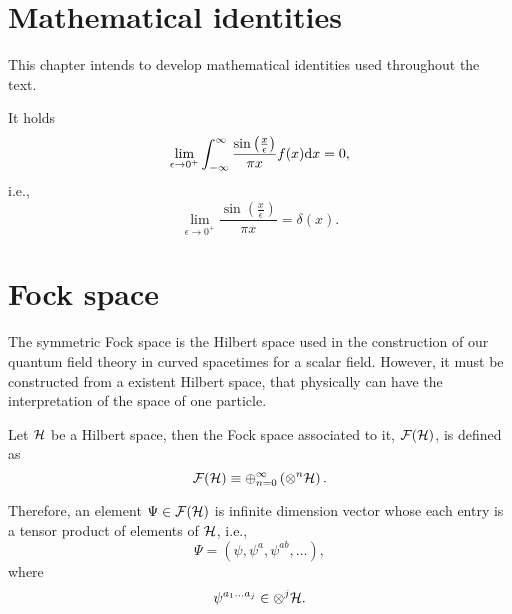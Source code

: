 \appendix

\chapter{Mathematical identities}

This chapter intends to develop mathematical identities used throughout the text.
\begin{proposition}\label{prop:sin-delta}
    It holds
    \begin{equation}
        \lim_{\epsilon\to0^+}\int_{-\infty}^{\infty}\frac{\sin{\left(\frac{x}{\epsilon}\right)}}{\pi x}f(x)\mathrm{d} x=0,
    \end{equation}
    i.e.,
    \begin{equation}
        \lim_{\epsilon\to0^+}\frac{\sin{\left(\frac{x}{\epsilon}\right)}}{\pi x}=\delta(x).
    \end{equation}
\end{proposition}
\vspace{1mm}
\begin{center}
\end{center}
\let\clearpage
\newpage
\pagestyle{empty}\cleardoublepage


\chapter{Fock space}
\pagestyle{fancy}

The symmetric Fock space is the Hilbert space used in the construction of our quantum field theory in curved spacetimes for a scalar field. However, it must be constructed from a existent Hilbert space, that physically can have the interpretation of the space of one particle.

Let \({\mathcal{H}}\) be a Hilbert space, then the Fock space associated to it, \({\mathcal{F}}({\mathcal{H}})\), is defined as
\begin{equation}
    {\mathcal{F}}({\mathcal{H}})\equiv\oplus_{n=0}^{\infty}\left(\otimes^{n}{\mathcal{H}}\right).
\end{equation}

Therefore, an element \(\Psi\in{\mathcal{F}}({\mathcal{H}})\) is infinite dimension vector whose each entry is a tensor product of elements of \({\mathcal{H}}\), i.e.,
\begin{equation}
    \Psi=\left(\psi,\psi^a,\psi^{ab},\dots\right),
\end{equation}
where
\begin{equation}
    \psi^{a_1\dots a_j}\in\otimes^j{\mathcal{H}}.
\end{equation}

